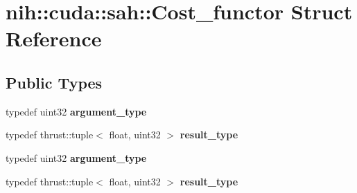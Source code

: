 \hypertarget{structnih_1_1cuda_1_1sah_1_1_cost__functor}{
\section{nih\-:\-:cuda\-:\-:sah\-:\-:\-Cost\-\_\-functor \-Struct \-Reference}
\label{structnih_1_1cuda_1_1sah_1_1_cost__functor}
}
\subsection*{\-Public \-Types}
\begin{DoxyCompactItemize}
\item 
\hypertarget{structnih_1_1cuda_1_1sah_1_1_cost__functor_a38a5aca628c4d87e2d8a710230a231fe}{
typedef uint32 {\bfseries argument\-\_\-type}}
\label{structnih_1_1cuda_1_1sah_1_1_cost__functor_a38a5aca628c4d87e2d8a710230a231fe}

\item 
\hypertarget{structnih_1_1cuda_1_1sah_1_1_cost__functor_ae49783fa17485a9e2584c1294ec3239c}{
typedef thrust\-::tuple$<$ float, \*
uint32 $>$ {\bfseries result\-\_\-type}}
\label{structnih_1_1cuda_1_1sah_1_1_cost__functor_ae49783fa17485a9e2584c1294ec3239c}

\item 
\hypertarget{structnih_1_1cuda_1_1sah_1_1_cost__functor_a38a5aca628c4d87e2d8a710230a231fe}{
typedef uint32 {\bfseries argument\-\_\-type}}
\label{structnih_1_1cuda_1_1sah_1_1_cost__functor_a38a5aca628c4d87e2d8a710230a231fe}

\item 
\hypertarget{structnih_1_1cuda_1_1sah_1_1_cost__functor_ae49783fa17485a9e2584c1294ec3239c}{
typedef thrust\-::tuple$<$ float, \*
uint32 $>$ {\bfseries result\-\_\-type}}
\label{structnih_1_1cuda_1_1sah_1_1_cost__functor_ae49783fa17485a9e2584c1294ec3239c}

\end{DoxyCompactItemize}
